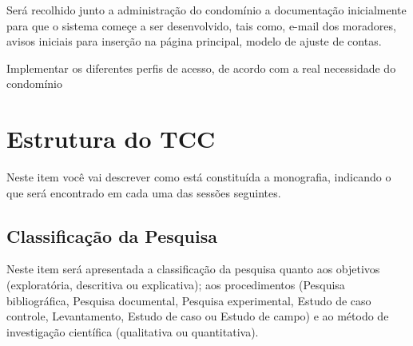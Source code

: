 Será recolhido junto a administração do condomínio a documentação inicialmente
para que o sistema começe a ser desenvolvido, tais como, e-mail dos moradores,
avisos iniciais para inserção na página principal, modelo de ajuste de contas.

Implementar os diferentes perfis de acesso, de acordo com a real necessidade
do condomínio

\section{Estrutura do TCC}
Neste item você vai descrever como está constituída a monografia, indicando o
que será encontrado em cada uma das sessões seguintes.

\subsection{Classificação da Pesquisa}
Neste item será apresentada a classificação da pesquisa quanto aos objetivos
(exploratória, descritiva ou explicativa); aos procedimentos (Pesquisa
bibliográfica, Pesquisa documental, Pesquisa experimental, Estudo de caso
controle, Levantamento, Estudo de caso ou Estudo de campo) e ao método de
investigação científica (qualitativa ou quantitativa).
